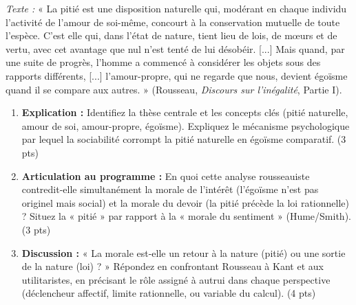 \documentclass[11pt]{article}
\begin{document}
\begin{exercice}
    \textit{Texte :} « La pitié est une disposition naturelle qui, modérant en chaque individu l'activité de l'amour de soi-même, concourt à la conservation mutuelle de toute l'espèce. C'est elle qui, dans l'état de nature, tient lieu de lois, de mœurs et de vertu, avec cet avantage que nul n'est tenté de lui désobéir. [...] Mais quand, par une suite de progrès, l'homme a commencé à considérer les objets sous des rapports différents, [...] l'amour-propre, qui ne regarde que nous, devient égoïsme quand il se compare aux autres. » (Rousseau, \textit{Discours sur l'inégalité}, Partie I).
    \begin{enumerate}
        \item \textbf{Explication :} Identifiez la thèse centrale et les concepts clés (pitié naturelle, amour de soi, amour-propre, égoïsme). Expliquez le mécanisme psychologique par lequel la sociabilité corrompt la pitié naturelle en égoïsme comparatif. (3 pts)
        \item \textbf{Articulation au programme :} En quoi cette analyse rousseauiste contredit-elle simultanément la morale de l'intérêt (l'égoïsme n'est pas originel mais social) et la morale du devoir (la pitié précède la loi rationnelle) ? Situez la « pitié » par rapport à la « morale du sentiment » (Hume/Smith). (3 pts)
        \item \textbf{Discussion :} « La morale est-elle un retour à la nature (pitié) ou une sortie de la nature (loi) ? » Répondez en confrontant Rousseau à Kant et aux utilitaristes, en précisant le rôle assigné à autrui dans chaque perspective (déclencheur affectif, limite rationnelle, ou variable du calcul). (4 pts)
    \end{enumerate}
\end{exercice}
\end{document}
